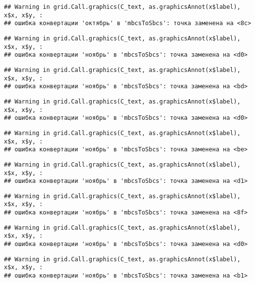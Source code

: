 \documentclass[
]{article}
\begin{document}
\begin{verbatim}
## Warning in grid.Call.graphics(C_text, as.graphicsAnnot(x$label), x$x, x$y, :
## ошибка конвертации 'октябрь' в 'mbcsToSbcs': точка заменена на <8c>
\end{verbatim}

\begin{verbatim}
## Warning in grid.Call.graphics(C_text, as.graphicsAnnot(x$label), x$x, x$y, :
## ошибка конвертации 'ноябрь' в 'mbcsToSbcs': точка заменена на <d0>
\end{verbatim}

\begin{verbatim}
## Warning in grid.Call.graphics(C_text, as.graphicsAnnot(x$label), x$x, x$y, :
## ошибка конвертации 'ноябрь' в 'mbcsToSbcs': точка заменена на <bd>
\end{verbatim}

\begin{verbatim}
## Warning in grid.Call.graphics(C_text, as.graphicsAnnot(x$label), x$x, x$y, :
## ошибка конвертации 'ноябрь' в 'mbcsToSbcs': точка заменена на <d0>
\end{verbatim}

\begin{verbatim}
## Warning in grid.Call.graphics(C_text, as.graphicsAnnot(x$label), x$x, x$y, :
## ошибка конвертации 'ноябрь' в 'mbcsToSbcs': точка заменена на <be>
\end{verbatim}

\begin{verbatim}
## Warning in grid.Call.graphics(C_text, as.graphicsAnnot(x$label), x$x, x$y, :
## ошибка конвертации 'ноябрь' в 'mbcsToSbcs': точка заменена на <d1>
\end{verbatim}

\begin{verbatim}
## Warning in grid.Call.graphics(C_text, as.graphicsAnnot(x$label), x$x, x$y, :
## ошибка конвертации 'ноябрь' в 'mbcsToSbcs': точка заменена на <8f>
\end{verbatim}

\begin{verbatim}
## Warning in grid.Call.graphics(C_text, as.graphicsAnnot(x$label), x$x, x$y, :
## ошибка конвертации 'ноябрь' в 'mbcsToSbcs': точка заменена на <d0>
\end{verbatim}

\begin{verbatim}
## Warning in grid.Call.graphics(C_text, as.graphicsAnnot(x$label), x$x, x$y, :
## ошибка конвертации 'ноябрь' в 'mbcsToSbcs': точка заменена на <b1>
\end{verbatim}
\end{document}
